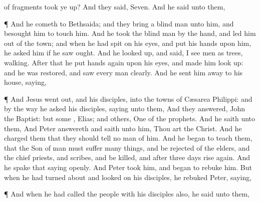 {{{of fragments
took ye up?}}
And they
said,
Seven.
And he
said unto
them,
{}
\par }{\PP {}¶
And he
cometh
to
Bethsaida;
and they
bring a blind
man unto
him,
and
besought
him
to
touch
him.
And he
took the blind
man by the
hand, and
led
him out
of the
town;
and when he had
spit
on
his
eyes, and
put his
hands upon
him, he
asked
him
if he
saw
ought.
And he looked
up, and
said, I
see
men
as
trees,
walking.
After
that he
put
{}
hands
again
upon
his
eyes,
and
made
him look
up:
and he was
restored,
and
saw every
man
clearly.
And he
sent
him
away
to
his
house,
saying,
{}
\par }{\PP {}¶
And
Jesus went
out,
and
his
disciples,
into the
towns of
Cæsarea
Philippi:
and
by the
way he
asked
his
disciples,
saying unto
them,
{}
And they
answered,
John the
Baptist:
but
some
{},
Elias;
and
others,
One of the
prophets.
And
he
saith unto
them,
{}
And
Peter
answereth and
saith unto
him,
Thou
art the
Christ.
And he
charged
them
that they should
tell no
man
of
him.
And he
began to
teach
them,
that the
Son of
man
must
suffer many
things,
and be
rejected
of the
elders,
and
{} the chief
priests,
and
scribes,
and be
killed,
and
after
three
days rise
again.
And he
spake that
saying
openly.
And
Peter
took
him, and
began to
rebuke
him.
But when he had turned
about
and looked
on
his
disciples, he
rebuked
Peter,
saying,
{}
\par }{\PP {}¶
And when he had
called the
people
{}
with
his
disciples
also, he
said unto
them,
{}

}
